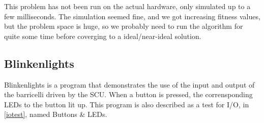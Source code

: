 This problem has not been run on the actual hardware, only simulated up to a few milliseconds.
The simulation seemed fine, and we got increasing fitness values, but the problem space is huge, so we probably need to run the algorithm for quite some time before coverging to a ideal/near-ideal solution.

\subsection{Blinkenlights}
Blinkenlights is a program that demonstrates the use of the input and output of the \Gls{barricelli} driven by the \Gls{SCU}.
When a button is pressed, the corrensponding LEDs to the button lit up.
This program is also described as a test for I/O, in \vref{iotest}, named Buttons \& LEDs.

